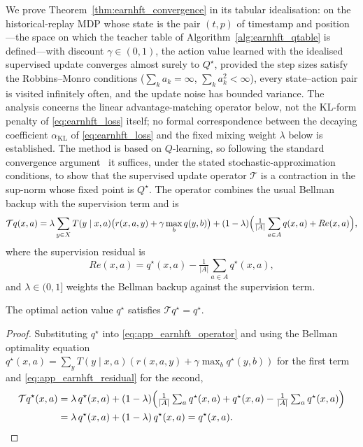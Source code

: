 We prove Theorem~\ref{thm:earnhft_convergence} in its tabular idealisation: on the historical-replay MDP whose state is the pair $(t,p)$ of timestamp and position---the space on which the teacher table of Algorithm~\ref{alg:earnhft_qtable} is defined---with discount $\gamma\in(0,1)$, the action value learned with the idealised supervised update converges almost surely to $Q^\star$, provided the step sizes satisfy the Robbins--Monro conditions ($\sum_k a_k=\infty$, $\sum_k a_k^2<\infty$), every state--action pair is visited infinitely often, and the update noise has bounded variance. The analysis concerns the linear advantage-matching operator below, not the KL-form penalty of \eqref{eq:earnhft_loss} itself; no formal correspondence between the decaying coefficient $\alpha_{\mathrm{KL}}$ of \eqref{eq:earnhft_loss} and the fixed mixing weight $\lambda$ below is established. The method is based on $Q$-learning, so following the standard convergence argument~\cite{jaakkola1993convergence} it suffices, under the stated stochastic-approximation conditions, to show that the supervised update operator $\mathcal{T}$ is a contraction in the sup-norm whose fixed point is $Q^\star$. The operator combines the usual Bellman backup with the supervision term and is
\begin{equation}
\label{eq:app_earnhft_operator}
\mathcal{T}q(x,a) = \lambda\sum_{y\in X}T(y\mid x,a)\bigl(r(x,a,y)+\gamma\max_b q(y,b)\bigr) + (1-\lambda)\Bigl(\tfrac{1}{|A|}\sum_{a\in A}q(x,a)+Re(x,a)\Bigr),
\end{equation}
where the supervision residual is
\begin{equation}
\label{eq:app_earnhft_residual}
Re(x,a) = q^\star(x,a) - \tfrac{1}{|A|}\sum_{a\in A}q^\star(x,a),
\end{equation}
and $\lambda\in(0,1]$ weights the Bellman backup against the supervision term.

\begin{proposition}
\label{prop:app_earnhft_fixed}
The optimal action value $q^\star$ satisfies $\mathcal{T}q^\star = q^\star$.
\end{proposition}
\begin{proof}
Substituting $q^\star$ into \eqref{eq:app_earnhft_operator} and using the Bellman optimality equation $q^\star(x,a)=\sum_y T(y\mid x,a)(r(x,a,y)+\gamma\max_b q^\star(y,b))$ for the first term and \eqref{eq:app_earnhft_residual} for the second,
\begin{align*}
\mathcal{T}q^\star(x,a) &= \lambda\, q^\star(x,a) + (1-\lambda)\Bigl(\tfrac{1}{|A|}\textstyle\sum_a q^\star(x,a) + q^\star(x,a) - \tfrac{1}{|A|}\textstyle\sum_a q^\star(x,a)\Bigr) \\
&= \lambda\, q^\star(x,a) + (1-\lambda)\, q^\star(x,a) = q^\star(x,a). \qedhere
\end{align*}
\end{proof}

